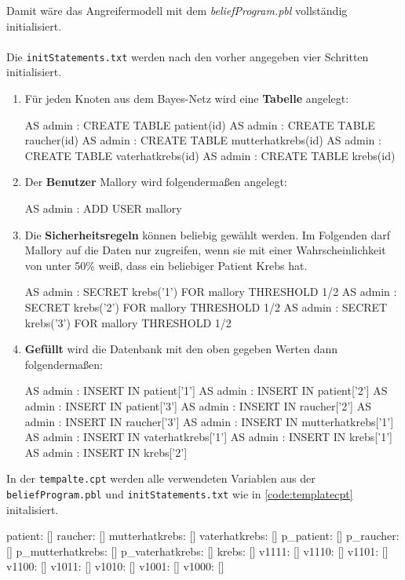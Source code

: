 \documentclass[german,version-2020-11]{uzl-thesis}
\begin{document}
Damit wäre das Angreifermodell mit dem \textit{beliefProgram.pbl} vollständig initialisiert.\\ \\
Die \texttt{initStatements.txt} werden nach den vorher angegeben vier Schritten initialisiert.
\begin{enumerate}
	\item  Für jeden Knoten aus dem Bayes-Netz wird eine \textbf{Tabelle} angelegt: 
\begin{Pseudocode}
AS admin : CREATE TABLE patient(id)
AS admin : CREATE TABLE raucher(id)
AS admin : CREATE TABLE mutterhatkrebs(id)
AS admin : CREATE TABLE vaterhatkrebs(id)
AS admin : CREATE TABLE krebs(id)
\end{Pseudocode}
\item Der \textbf{Benutzer} Mallory wird folgendermaßen angelegt:
\begin{Pseudocode}
AS admin : ADD USER mallory
\end{Pseudocode}
\item Die \textbf{Sicherheitsregeln} können beliebig gewählt werden. Im Folgenden darf Mallory auf die Daten nur zugreifen, wenn sie mit einer Wahrscheinlichkeit von unter 50\% weiß, dass ein beliebiger Patient Krebs hat.
\begin{Pseudocode}
AS admin : SECRET krebs('1') FOR mallory THRESHOLD 1/2
AS admin : SECRET krebs('2') FOR mallory THRESHOLD 1/2
AS admin : SECRET krebs('3') FOR mallory THRESHOLD 1/2
\end{Pseudocode}
\item \textbf{Gefüllt} wird die Datenbank mit den oben gegeben Werten dann folgendermaßen:
\begin{Pseudocode}
AS admin : INSERT IN patient['1']
AS admin : INSERT IN patient['2']
AS admin : INSERT IN patient['3']
AS admin : INSERT IN raucher['2']
AS admin : INSERT IN raucher['3']
AS admin : INSERT IN mutterhatkrebs['1']
AS admin : INSERT IN vaterhatkrebs['1']
AS admin : INSERT IN krebs['1']
AS admin : INSERT IN krebs['2']
\end{Pseudocode}
\end{enumerate}
In der  \texttt{tempalte.cpt} werden alle verwendeten Variablen aus der \texttt{beliefProgram.pbl} und \texttt{initStatements.txt} wie in \autoref{code:templatecpt} initalisiert.
\begin{Pseudocode}[caption={\texttt{tempalte.cpt} vom Beispiel} , label = {code:templatecpt} , numbers=left]
patient: []
raucher: []
mutterhatkrebs: []
vaterhatkrebs: []
p_patient: []
p_raucher: []
p_mutterhatkrebs: []
p_vaterhatkrebs: []
krebs: []
v1111: []
v1110: []
v1101: []
v1100: []
v1011: []
v1010: []
v1001: []
v1000: []
\end{Pseudocode}
\end{document}
